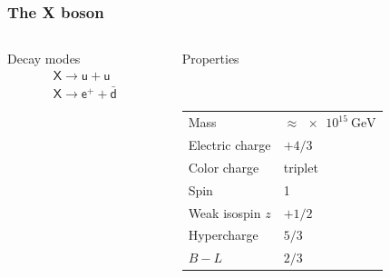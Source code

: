 \documentclass[english, fleqn]{beamer}
\begin{document}
\begin{frame}
    \frametitle{The X boson}

    \begin{columns}[t]
        \begin{column}{.5\textwidth}
            \begin{block}{Decay modes}
                \begin{gather*}
                    \mathsf X \to \mathsf u + \mathsf u \\
                    \mathsf X \to \mathsf e^+ + \bar{\mathsf d}
                \end{gather*}
            \end{block}
        \end{column}
        \begin{column}{.5\textwidth}
            \begin{block}{Properties}

                \

                \begin{tabular}{ll}
                    Mass & $\approx \SI{e15}{\giga\electronvolt}$ \\
                    Electric charge & $+4/3$ \\
                    Color charge & triplet \\
                    Spin & 1 \\
                    Weak isospin $z$ & $+1/2$ \\
                    Hypercharge & $5/3$ \\
                    $B - L$ & $2/3$
                \end{tabular}
            \end{block}
        \end{column}
    \end{columns}

    \parencite{wikipedia/x_y_bosons}
\end{frame}
\end{document}
